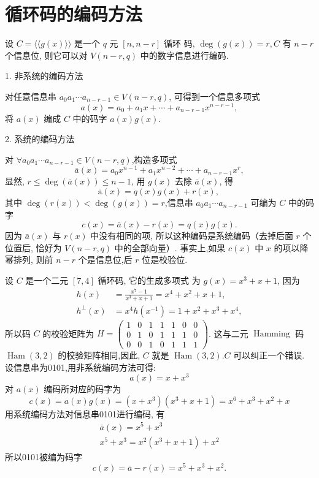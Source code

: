 \section{循环码的编码方法}
设 $ C=\langle\langle g(x)\rangle\rangle $ 是一个 $ q $ 元 $ [n, n-r] $ 循环
码, $ \operatorname{deg}(g(x))=r, C $ 有 $ n-r $ 个信息位, 则它可以对 $ V(n-r, q) $ 中的数字信息进行编码.

1. 非系统的编码方法

对任意信息串 $ a_{0} a_{1} \cdots a_{n-r-1} \in V(n-r, q) $, 可得到一个信息多项式
$$
a(x)=a_{0}+a_{1} x+\cdots+a_{n-r-1} x^{n-r-1},
$$
将 $ a(x) $ 编成 $ C $ 中的码字 $ a(x) g(x) $.

2. 系统的编码方法

对 $ \forall a_{0} a_{1} \cdots a_{n-r-1} \in V(n-r, q) $,构造多项式
$$
\bar{a}(x)=a_{0} x^{n-1}+a_{1} x^{n-2}+\cdots+a_{n-r-1} x^{r},
$$
显然, $ r \leq \operatorname{deg}(\bar{a}(x)) \leq n-1 $, 用 $ g(x) $ 去除 $ \bar{a}(x) $, 得
$$
\overline{\mathrm{a}}(x)=q(x) g(x)+r(x) \text {, }
$$
其中 $ \operatorname{deg}(r(x))<\operatorname{deg}(g(x))=r $,信息串 $ a_{0} a_{1} \cdots a_{n-r-1} $ 可编为 $ C $ 中的码字
$$
c(x)=\bar{a}(x)-r(x)=q(x) g(x) .
$$
因为 $ \bar{a}(x) $ 与 $ r(x) $ 中没有相同的项, 所以这种编码是系统编码（去掉后面 $ r $ 个位置后, 恰好为 $ V(n-r, q) $ 中的全部向量）. 事实上,如果 $ c(x) $ 中 $ x $ 的项以降幂排列, 则前 $ n-r $ 个是信息位,后 $ r $ 位是校验位.


\begin{example}
设 $ C $ 是一个二元 $ [7,4] $ 循环码, 它的生成多项式
为 $ g(x)=x^{3}+x+1 $, 因为
$$
\begin{aligned}
h(x)&=\frac{x^{7}-1}{x^{3}+x+1}=x^{4}+x^{2}+x+1, \\
h^{\perp}(x)&=x^{4} h\left(x^{-1}\right)=1+x^{2}+x^{3}+x^{4},
\end{aligned}
$$
所以码 $ C $ 的校验矩阵为 $ H=\left(\begin{array}{lllllll}1 & 0 & 1 & 1 & 1 & 0 & 0 \\ 0 & 1 & 0 & 1 & 1 & 1 & 0 \\ 0 & 0 & 1 & 0 & 1 & 1 & 1\end{array}\right) $.
这与二元 $ \operatorname{Hamming} $ 码 $ \operatorname{Ham}(3,2) $ 的校验矩阵相同,因此, $ C $ 就是 $ \operatorname{Ham}(3,2) . C $ 可以纠正一个错误.
设信息串为0101,用非系统编码方法可得:
$$
a(x)=x+x^{3}
$$
对 $ a(x) $ 编码所对应的码字为
$$
c(x)=a(x) g(x)=\left(x+x^{3}\right)\left(x^{3}+x+1\right)=x^{6}+x^{3}+x^{2}+x
$$
用系统编码方法对信息串0101进行编码, 有
$$
\begin{array}{l}
\bar{a}(x)=x^{5}+x^{3} \\
x^{5}+x^{3}=x^{2}\left(x^{3}+x+1\right)+x^{2}
\end{array}
$$
所以0101被编为码字
$$
c(x)=\bar{a}-r(x)=x^{5}+x^{3}+x^{2} .
$$
\end{example}


